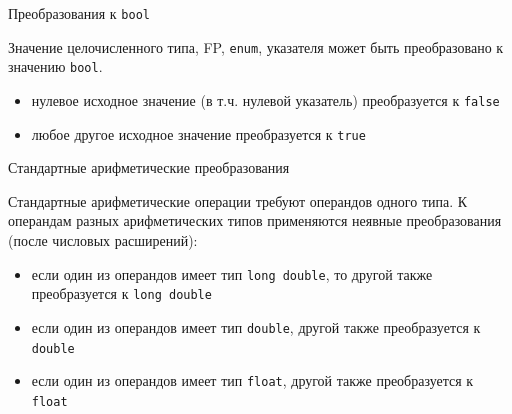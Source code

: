\documentclass[unknownkeysallowed,xcolor=table]{beamer}
\begin{document}
\begin{frame}{Преобразования к \lstinline{bool}}

Значение целочисленного типа, FP, \lstinline{enum}, указателя может быть преобразовано к значению \lstinline{bool}.
\vspace{1em}

\begin{itemize}
  \item нулевое исходное значение (в т.ч. нулевой указатель) преобразуется к \lstinline{false} \vspace{1em}
  \item любое другое исходное значение преобразуется к \lstinline{true}
\end{itemize}

\end{frame}

\begin{frame}{Стандартные арифметические преобразования}

Стандартные арифметические операции требуют операндов одного типа. К операндам разных арифметических типов применяются неявные преобразования (после числовых расширений):
\vspace{1em}

\begin{itemize}
  \item если один из операндов имеет тип \lstinline{long double}, то другой также преобразуется к \lstinline{long double} \vspace{0.5em}
  \item если один из операндов имеет тип \lstinline{double}, другой также преобразуется к \lstinline{double} \vspace{0.5em}
  \item если один из операндов имеет тип \lstinline{float}, другой также преобразуется к \lstinline{float} \vspace{0.5em}
\end{itemize}

\end{frame}
\end{document}
